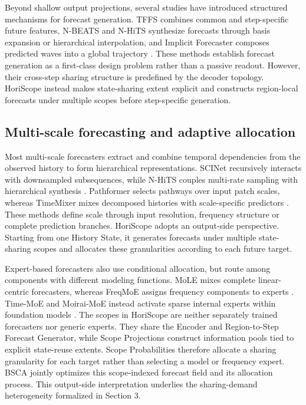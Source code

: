 \documentclass[final,3p,times]{elsarticle}
\begin{document}
Beyond shallow output projections, several studies have introduced structured mechanisms for forecast generation. TFFS combines common and step-specific future features, N-BEATS and N-HiTS synthesize forecasts through basis expansion or hierarchical interpolation, and Implicit Forecaster composes predicted waves into a global trajectory \citep{zhang2024tffs,oreshkin2020nbeats,challu2023nhits,li2025implicit}. These methods establish forecast generation as a first-class design problem rather than a passive readout. However, their cross-step sharing structure is predefined by the decoder topology. HoriScope instead makes state-sharing extent explicit and constructs region-local forecasts under multiple scopes before step-specific generation.

\subsection{Multi-scale forecasting and adaptive allocation}


Most multi-scale forecasters extract and combine temporal dependencies from the observed history to form hierarchical representations. SCINet recursively interacts with downsampled subsequences, while N-HiTS couples multi-rate sampling with hierarchical synthesis \citep{liu2022scinet,challu2023nhits}. Pathformer selects pathways over input patch scales, whereas TimeMixer mixes decomposed histories with scale-specific predictors \citep{chen2024pathformer,wang2024timemixer}. These methods define scale through input resolution, frequency structure or complete prediction branches. HoriScope adopts an output-side perspective. Starting from one History State, it generates forecasts under multiple state-sharing scopes and allocates these granularities according to each future target.

Expert-based forecasters also use conditional allocation, but route among components with different modeling functions. MoLE mixes complete linear-centric forecasters, whereas FreqMoE assigns frequency components to experts \citep{ni2024mole,liu2025freqmoe}. Time-MoE and Moirai-MoE instead activate sparse internal experts within foundation models \citep{shi2025timemoe,liu2025moiraimoe}. The scopes in HoriScope are neither separately trained forecasters nor generic experts. They share the Encoder and Region-to-Step Forecast Generator, while Scope Projections construct information pools tied to explicit state-reuse extents. Scope Probabilities therefore allocate a sharing granularity for each target rather than selecting a model or frequency expert. BSCA jointly optimizes this scope-indexed forecast field and its allocation process. This output-side interpretation underlies the sharing-demand heterogeneity formalized in Section 3.
\end{document}

